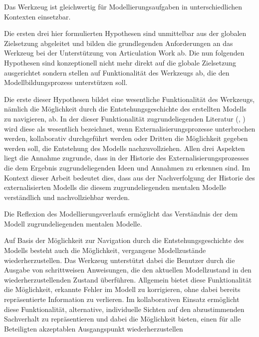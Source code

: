 \begin{hyp}
	\label{hyp:kontexte}
	Das Werkzeug ist gleichwertig für Modellierungsaufgaben in unterschiedlichen Kontexten einsetzbar.
\end{hyp}

Die ersten drei hier formulierten Hypothesen sind unmittelbar aus der globalen Zielsetzung abgeleitet und bilden die grundlegenden Anforderungen an das Werkzeug bei der Unterstützung von Articulation Work ab. Die nun folgenden Hypothesen sind konzeptionell nicht mehr direkt auf die globale Zielsetzung ausgerichtet sondern stellen auf Funktionalität des Werkzeugs ab, die den Modellbildungsprozess unterstützen soll. 

Die erste dieser Hypothesen bildet eine wesentliche Funktionalität des Werkzeugs, nämlich die Möglichkeit durch die Entstehungsgeschichte des erstellten Modells zu navigieren, ab. In der dieser Funktionalität zugrundeliegenden Literatur (\citep{Shipman00}, \citep{Klemmer02}) wird diese als wesentlich bezeichnet, wenn Externalisierungsprozesse unterbrochen werden, kollaborativ durchgeführt werden oder Dritten die Möglichkeit gegeben werden soll, die Entstehung des Modells nachzuvollziehen. Allen drei Aspekten liegt die Annahme zugrunde, dass in der Historie des Externalisierungsprozesses die dem Ergebnis zugrundeliegenden Ideen und Annahmen zu erkennen sind. Im Kontext dieser Arbeit bedeutet dies, dass aus der Nachverfolgung der Historie des externalisierten Modells die diesem zugrundeliegenden mentalen Modelle verständlich und nachvollziehbar werden. 

\begin{hyp}
	\label{hyp:historie}
	Die Reflexion des Modellierungsverlaufs ermöglicht das Verständnis der dem Modell zugrundeliegenden mentalen Modelle.
\end{hyp}

Auf Basis der Möglichkeit zur Navigation durch die Entstehungsgeschichte des Modells besteht auch die Möglichkeit, vergangene Modellzustände wiederherzustellen. Das Werkzeug unterstützt dabei die Benutzer durch die Ausgabe von schrittweisen Anweisungen, die den aktuellen Modellzustand in den wiederherzustellenden Zustand überführen. Allgemein bietet diese Funktionalität die Möglichkeit, erkannte Fehler im Modell zu korrigieren, ohne dabei bereits repräsentierte Information zu verlieren. Im kollaborativen Einsatz ermöglicht diese Funktionalität, alternative, individuelle Sichten auf den abzustimmenden Sachverhalt zu repräsentieren und dabei die Möglichkeit bieten, einen für alle Beteiligten akzeptablen Ausgangspunkt wiederherzustellen

